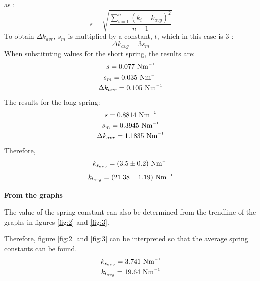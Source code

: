 \documentclass[a4paper, 10pt]{article}
\newcommand{\inv}{^{\raisebox{.2ex}{$\scriptscriptstyle-1$}}}
\newcommand{\unit}[1]{~\mathrm{#1}}
\begin{document}
\begin{justify}
as \cite{profcomp}:
\begin{equation}\label{eq:13}
s = \sqrt{\frac{\sum_{i=1}^{n}(k_i-k_{avg})^2}{n-1}}
\end{equation}
To obtain $\Delta k_{avr}$, $s_m$ is multiplied by a constant, $t$, which in
this case is 3 \cite{profcomp}:
\begin{equation}\label{eq:14}
    \Delta k_{avg} = 3s_m
\end{equation}
When substituting values for the short spring, the results are:
\begin{gather*}
    s = 0.077\unit{N m\inv}\\
    s_m = 0.035\unit{N m\inv}\\
    \Delta k_{avr} = 0.105\unit{N m\inv}
\end{gather*}
The results for the long spring:
\begin{gather*}
    s = 0.8814\unit{N m\inv}\\
    s_m = 0.3945\unit{N m\inv}\\
    \Delta k_{avr} = 1.1835\unit{Nm\inv}
\end{gather*}
Therefore,
\[ k_{s_{avg}} = (3.5 \pm 0.2)\unit{Nm\inv}\]
\[k_{l_{avg}} = (21.38 \pm 1.19)\unit{Nm\inv}\]
\par
\textbf{From the graphs}
\par
The value of the spring constant can also be determined from the trendline of
the graphs in figures \ref{fig:2} and \ref{fig:3}.
\par
Therefore, figure \ref{fig:2} and \ref{fig:3} can be interpreted so that the
average spring constants can be found.
\begin{gather*}
 k_{s_{avg}} = 3.741\unit{Nm\inv}\\
 k_{l_{avg}} = 19.64\unit{Nm\inv}
\end{gather*}
\newpage

\end{justify}
\end{document}
